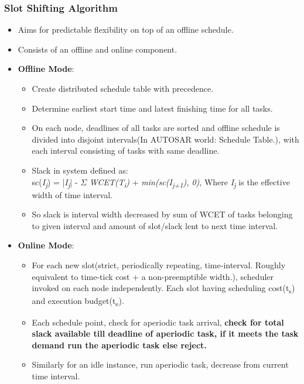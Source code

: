 \subsubsection*{Slot Shifting Algorithm}
\begin{itemize}
	\item Aims for predictable flexibility on top of an offline schedule.
	\item Consists of an offline and online component.
	\item \textbf{Offline Mode}:
	\begin{itemize}
		\item Create distributed schedule table with precedence.
		\item Determine earliest start time and latest finishing time for all tasks.
		\item On each node, deadlines of all tasks are sorted and offline schedule is divided into disjoint intervals(In AUTOSAR world: Schedule Table.), with each interval consisting of tasks with same deadline.
		\item Slack in system defined as:\\
		sc(\textit{I\textsubscript{j}}) = |\textit{I\textsubscript{j}}| - $\Sigma$ \textit{WCET(T\textsubscript{i})} + \textit{min(sc(I\textsubscript{j+1}), 0)}, Where \textit{I\textsubscript{j}} is the effective width of time interval.
		\item So slack is interval width decreased by sum of WCET of tasks belonging to given interval and amount of slot/slack lent to next time interval.
	\end{itemize}
\item \textbf{Online Mode}:
	\begin{itemize}
		\item For each new slot(strict, periodically repeating, time-interval. Roughly equivalent to time-tick cost + a non-preemptible width.), scheduler invoked on each node independently. Each slot having scheduling cost(t\textsubscript{s}) and execution budget(t\textsubscript{e}).
		\item Each schedule point, check for aperiodic task arrival, \textbf{check for total slack available till deadline of aperiodic task, if it meets the task demand run the aperiodic task else reject.}
		\item Similarly for an idle instance, run aperiodic task, decrease from current time interval.
	\end{itemize}
\end{itemize}
